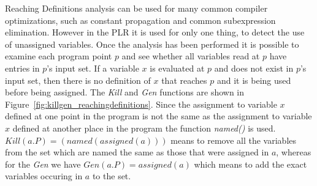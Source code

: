 	Reaching Definitions analysis can be used for many common compiler 
	optimizations, such as constant propagation and common subexpression 
	elimination. However in the PLR it is used for only one thing, to detect the 
	use of unassigned variables. Once the analysis has been performed it is 
	possible to examine each program point $p$ and see whether all variables
	read at $p$ have entries in $p$'s input set. If a variable $x$ is evaluated
	at $p$ and does not exist in $p$'s input set, then there is no definition
	of $x$ that reaches $p$ and it is being used before being assigned. The 
	\textit{Kill} and \textit{Gen} functions are shown in 
	Figure~\ref{fig:killgen_reachingdefinitions}. Since the assignment to 
	variable $x$ defined at one point in the program is not the same as the 
	assignment to variable $x$ defined at another place in the program the 
	function \textit{named()} is used. ${Kill(a.P) = (named(assigned(a)))}$ 
	means to remove all the variables from the set which are named the same as 
	those that were assigned in $a$, whereas for the \textit{Gen} we have 
	$Gen(a.P) = assigned(a)$ which means to add the exact variables occuring in
	$a$ to the set. 
	
